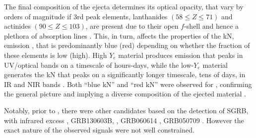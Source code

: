 
The final composition of the ejecta determines its optical opacity, that vary by orders of 
magnitude if $3$rd peak elements, lanthanides $(58\leq Z \leq71)$ and actinides 
$(90\leq Z \leq 103)$, are present due to their open $f$-shell and hence a plethora of 
absorption lines \citep{Tanaka:2013ana,Kasen:2013xka}.
%
This, in turn, affects the properties of the \ac{kN}, emission \citep{Metzger:2019zeh}, 
that is predominantly blue (red) depending on whether the fraction of these elements 
is low (high).
%
High $Y_e$ material produces emission that peaks in \ac{UV}/optical bands on a timescale 
of hours-days, while the low-$Y_e$ material generates the \ac{kN} that peaks on a significantly 
longer timescale, tens of days, in \ac{IR} and \ac{NIR} bands
\citep{Barnes:2013wka,Grossman:2013lqa,Lippuner:2015gwa}.
%
Both ``blue \ac{kN}'' and ``red \ac{kN}'' were observed for \GW{}, confirming the general 
picture and implying a diverse composition of the ejected material
\citep{Arcavi:2017xiz,Coulter:2017wya,Drout:2017ijr,Evans:2017mmy,Hallinan:2017woc,
    Kasliwal:2017ngb,Nicholl:2017ahq,Smartt:2017fuw,Soares-santos:2017lru,Tanvir:2017pws,
    Troja:2017nqp,Mooley:2018dlz,Ruan:2017bha,Lyman:2018qjg}.

%
% 
Notably, prior to \AT{}, there were other candidates based on the detection of \ac{SGRB}, 
with infrared excess \eg, 
GRB130603B, \citep{Berger:2013wna,Tanvir:2013pia}, 
GRB060614 \citep{Jin:2015txa,Yang:2015pha}, 
GRB050709 \citep{Jin:2016pnm}.
However the exact nature of the observed signals were not well constrained. 
%



